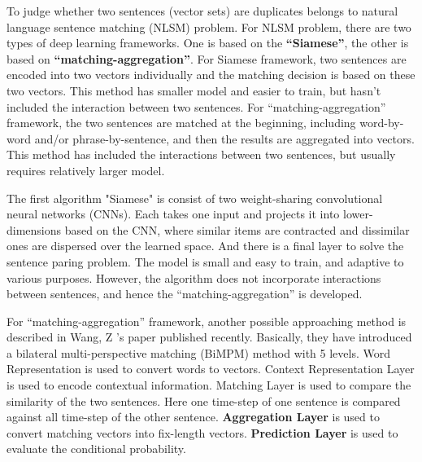 \documentclass[12pt]{article}
\begin{document}
To judge whether two sentences (vector sets) are duplicates belongs to natural language sentence matching (NLSM) problem. For NLSM problem, there are two types of deep learning frameworks. One is based on the \textbf{“Siamese”}, the other is based on \textbf{“matching-aggregation”}. For Siamese framework, two sentences are encoded into two vectors individually and the matching decision is based on these two vectors. This method has smaller model and easier to train, but hasn’t included the interaction between two sentences. For “matching-aggregation” framework, the two sentences are matched at the beginning, including word-by-word and/or phrase-by-sentence, and then the results are aggregated into vectors. This method has included the interactions between two sentences, but usually requires relatively larger model.

The first algorithm "Siamese"\cite{http://www.erogol.com/duplicate-question-detection-deep-learning/} is consist of two weight-sharing convolutional neural networks (CNNs). Each takes one input and projects it into lower-dimensions based on the CNN, where similar items are contracted and dissimilar ones are dispersed over the learned space. And there is a final layer to solve the sentence paring problem. The model is small and easy to train, and adaptive to various purposes. However, the algorithm does not incorporate interactions between sentences, and hence the “matching-aggregation” is developed.

For “matching-aggregation” framework, another possible approaching method is described in Wang, Z ’s paper published recently. \cite{Wang, Z. et al. Bilateral Multi-Perspective Matching for Natural Language Sentences. arXiv. 2017} Basically, they have introduced a bilateral multi-perspective matching (BiMPM) method with 5 levels. Word Representation is used to convert words to vectors. Context Representation Layer is used to encode contextual information. Matching Layer is used to compare the similarity of the two sentences. Here one time-step of one sentence is compared against all time-step of the other sentence. \textbf{Aggregation Layer} is used to convert matching vectors into fix-length vectors. \textbf{Prediction Layer} is used to evaluate the conditional probability. 



\end{document}
